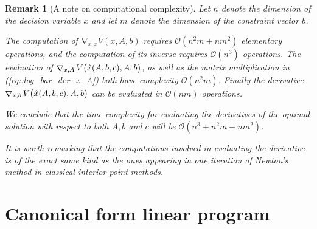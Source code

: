 \documentclass[12pt]{article}
\DeclareMathOperator{\grad}{\mathop{\nabla}}
\newcommand{\bpa}[1]{\big( #1 \big)}
\newtheorem{remark}{Remark}
\begin{document}
\begin{remark}[A note on computational complexity]
Let $n$ denote the dimension of the decision variable $x$ and let $m$ denote the dimension
of the constraint vector $b$.

The computation of $\grad_{x,x}V(x,A, b)$ requires $\mathcal{O}(n^2m + nm^2)$ elementary operations, and 
the computation of its inverse requires $\mathcal{O}(n^3)$ operations. 
The evaluation of $\grad_{x, A}V\bpa{\xopt, A, b}$, as well as the matrix 
multiplication in (\ref{eq::log_bar_der_x_A}) both have complexity $\mathcal{O}(n^2m)$.
Finally the derivative $\grad_{x, b}V\bpa{\xopt, A, b}$ can be evaluated in $\mathcal{O}(nm)$
operations.

We conclude that the time complexity for evaluating the derivatives of the optimal solution with respect to both $A, b$ and $c$ will be 
$\mathcal{O}(n^3 + n^2m + nm^2)$.

It is worth remarking that the computations involved in evaluating the derivative is of the exact same kind as the ones appearing
in one iteration of Newton's method in classical interior point methods.
\end{remark}

\section{Canonical form linear program}
\label{sec::Canonical_form_linear_program}
\end{document}
